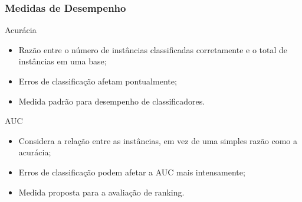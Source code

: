 \begin{frame}
    \frametitle{Medidas de Desempenho}

    \begin{block}{Acurácia}
        \begin{itemize}
            \item Razão entre o número de instâncias classificadas corretamente e o total de instâncias em uma base;
            \item Erros de classificação afetam pontualmente;
            \item Medida padrão para desempenho de classificadores.
        \end{itemize}
    \end{block}

    \begin{block}{AUC}
        \begin{itemize}
            \item Considera a relação entre as instâncias, em vez de uma simples razão como a acurácia;
            \item Erros de classificação podem afetar a AUC mais intensamente;
            \item Medida proposta para a avaliação de ranking.
        \end{itemize}
    \end{block}
\end{frame}